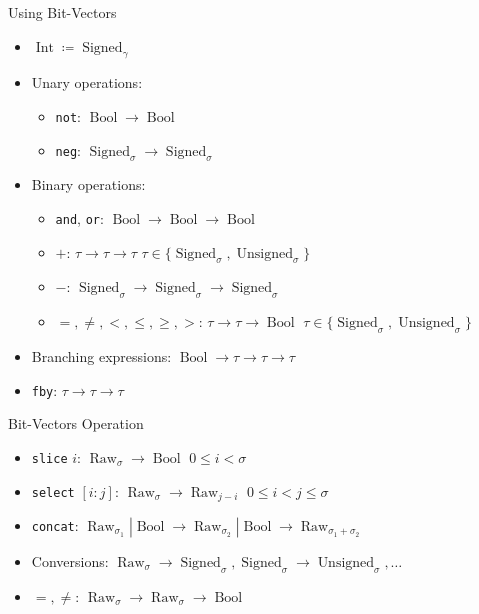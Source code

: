 \documentclass{beamer}
\DeclareMathOperator{\Bool}{Bool}
\DeclareMathOperator{\Int}{Int}
\DeclareMathOperator{\Signed}{Signed}
\DeclareMathOperator{\Unsigned}{Unsigned}
\DeclareMathOperator{\Raw}{Raw}
\begin{document}
\begin{frame}{Using Bit-Vectors}
    \begin{itemize}
        \setlength{\itemsep}{6pt}
        \item $\Int \coloneqq \Signed_{\gamma}$
        \item Unary operations:
              \begin{itemize}
                  \setlength{\itemsep}{3pt}
                  \item \texttt{not}: $\Bool \to \Bool$
                  \item \texttt{neg}: $\Signed_{\sigma} \to \Signed_{\sigma}$
              \end{itemize}
        \item Binary operations:
              \begin{itemize}
                  \setlength{\itemsep}{3pt}
                  \item \texttt{and}, \texttt{or}: $\Bool \to \Bool \to \Bool$
                  \item $+$: $\tau \to \tau \to \tau$ \hfill $\tau \in\{\Signed_{\sigma}, \Unsigned_{\sigma}\}$
                  \item $-$: $\Signed_{\sigma} \to \Signed_{\sigma} \to \Signed_{\sigma}$
                  \item $=, \neq, <, \leqslant, \geqslant, >$: $\tau \to \tau \to \Bool$ \hfill $\tau \in\{\Signed_{\sigma}, \Unsigned_{\sigma}\}$
              \end{itemize}
        \item Branching expressions: $\Bool \to \tau \to \tau \to \tau$
        \item \texttt{fby}: $\tau \to \tau \to \tau$
    \end{itemize}
\end{frame}

\begin{frame}{Bit-Vectors Operation}
    \begin{itemize}
        \setlength{\itemsep}{6pt}
        \item \texttt{slice} $i$: $\Raw_{\sigma} \to \Bool$ \hfill $0 \leqslant i < \sigma$
        \item \texttt{select} $[i:j]$: $\Raw_{\sigma} \to \Raw_{j - i}$ \hfill $0 \leqslant i < j \leqslant \sigma$
        \item \texttt{concat}: $\Raw_{\sigma_1}|\Bool \to \Raw_{\sigma_2}|\Bool \to \Raw_{\sigma_1 + \sigma_2}$
        \item Conversions: $\Raw_{\sigma} \to \Signed_{\sigma}, \Signed_{\sigma} \to \Unsigned_{\sigma}, \dots$
        \item $=, \neq$: $\Raw_{\sigma} \to \Raw_{\sigma} \to \Bool$
    \end{itemize}
\end{frame}
\end{document}
